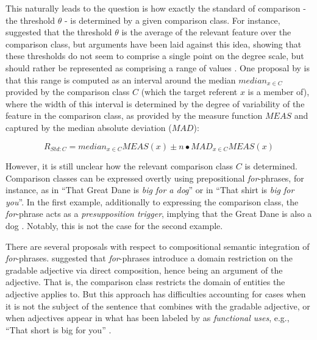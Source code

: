 This naturally leads to the question is how exactly the standard of comparison - the threshold $\theta$ - is determined by a given comparison class. For instance, \textcite{Cresswell1976} suggested that the threshold $\theta$ is the average of the relevant feature over the comparison class, but arguments have been laid against this idea, showing that these thresholds do not seem to comprise a single point on the degree scale, but should rather be represented as comprising a range of values \parencite{Kennedy2007, vonStechow1984}. 
One proposal by \textcite[p.194]{Solt2009} is that this range is computed as an interval around the median $median_{x\in C}$ provided by the comparison class $C$ (which the target referent $x$ is a member of), where the width of this interval is determined by the degree of variability of the feature in the comparison class, as provided by the measure function $MEAS$ and captured by the median absolute deviation ($MAD$):

$$R_{Std:C} = median_{x \in C} MEAS(x) \pm n \bullet MAD_{x \in C} MEAS(x)$$

However, it is still unclear how the relevant comparison class $C$ is determined. Comparison classes can be expressed overtly using prepositional \textit{for}-phrases, for instance, as in “That Great Dane is \emph{big for a dog}” or in “That shirt is \emph{big for you}”. In the first example, additionally to expressing the comparison class, the \textit{for}-phrase acts as a \textit{presupposition trigger}, implying that the Great Dane is also a dog \parencite[cf. ]{Bale2011, Solt2009}. Notably, this is not the case for the second example. 

There are several proposals with respect to compositional semantic integration of \textit{for}-phrases. \textcite{Kennedy2007} suggested that \textit{for}-phrases introduce a domain restriction on the gradable adjective via direct composition, hence being an argument of the adjective. That is, the comparison class restricts the domain of entities the adjective applies to. But this approach has difficulties accounting for cases when it is not the subject of the sentence that combines with the gradable adjective, or when adjectives appear in what has been labeled by \textcite{ebeling1994children} as \textit{functional uses}, e.g., “That short is big for you” \parencite{Solt2009}. 

